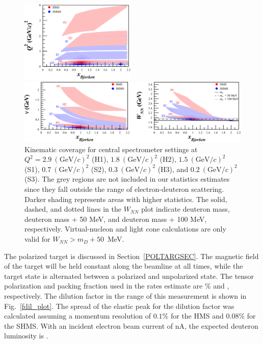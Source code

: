 \begin{figure}
\begin{center}
\includegraphics[width=0.49\textwidth]{figs/Pzz_30_all_q2.eps}

\includegraphics[width=\textwidth]{figs/Pzz_30_all_nu_wnn.eps}

\caption{\label{kincov} Kinematic coverage for central spectrometer settings at $Q^2=2.9~(\mathrm{GeV}/c)^2$ (H1), $1.8~(\mathrm{GeV}/c)^2$ (H2), $1.5~(\mathrm{GeV}/c)^2$ (S1), $0.7~(\mathrm{GeV}/c)^2$ (S2), $0.3~(\mathrm{GeV}/c)^2$ (H3), and $0.2~(\mathrm{GeV}/c)^2$ (S3). The grey regions are not included in our statistics estimates since they fall outside the range of electron-deuteron scattering. Darker shading represents areas with higher statistics. The solid, dashed, and dotted lines in the $W_{NN}$ plot indicate deuteron mass, deuteron mass + 50 MeV, and deuteron mass + 100 MeV, respectively. Virtual-nucleon and light cone calculations are only valid for $W_{NN}>m_D+50$~MeV.}
\end{center}
\end{figure}


The polarized \TARGET target is discussed in Section~\ref{POLTARGSEC}.  The magnetic field of the target will be held constant along the beamline at all times, while the target state is alternated between a polarized and unpolarized state.
The tensor polarization and packing fraction used in the rates estimate are \PZZ\% and \PF, respectively. 
The dilution factor in the range of this measurement is shown in Fig.~\ref{fdil_plot}. The spread of the elastic peak for the dilution factor was calculated assuming a momentum resolution of $0.1\%$ for the HMS and $0.08\%$ for the SHMS.
With an incident electron beam current of \CURRENT nA, the expected deuteron luminosity is \LUMI.

